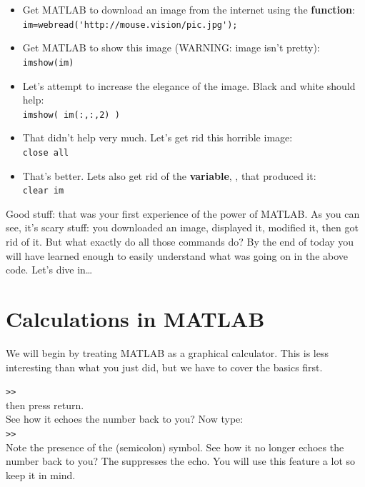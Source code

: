 \documentclass{article}
\begin{document}
\begin{itemize}
\item Get MATLAB to download an image from the internet using the  \textbf{function}:\\
\verb|im=webread('http://mouse.vision/pic.jpg');|\\
\item Get MATLAB to show this image (WARNING: image isn't pretty):\\
\verb|imshow(im)|\\
\item Let's attempt to increase the elegance of the image. Black and white should help:\\
\verb|imshow( im(:,:,2) )|\\
\item That didn't help very much. Let's get rid this horrible image:\\
\verb|close all|\\
\item That's better. Lets also get rid of the \textbf{variable}, , that produced it:\\
\verb|clear im|
\end{itemize}

Good stuff: that was your first experience of the power of MATLAB.
As you can see, it's  scary stuff: you downloaded an image, displayed it, modified it, then got rid of it.
But what exactly do all those commands do?
By the end of today you will have learned enough to easily understand what was going on in the above code.
Let's dive in\ldots


\pagebreak
\section{Calculations in MATLAB}

We will begin by treating MATLAB as a graphical calculator.
This is less interesting than what you just did, but we have to cover the basics first.

\verb|>>| \\
then press return.\\
See how it echoes the number back to you? Now type:\\
\verb|>>| \\
Note the presence of the \mcode{;} (semicolon) symbol.
See how it no longer echoes the number back to you?
The \mcode{;} suppresses the echo.
You will use this feature a lot so keep it in mind.
\end{document}
